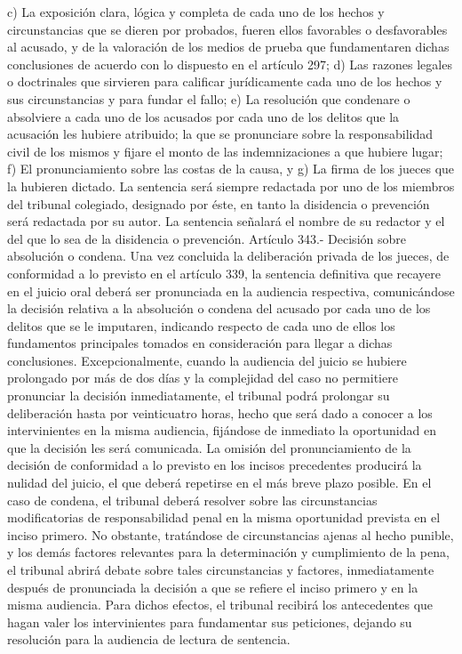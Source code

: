     c) La exposición clara, lógica y completa de cada uno de los hechos y circunstancias que se dieren por probados, fueren ellos favorables o desfavorables al acusado, y de la valoración de los medios de prueba que fundamentaren dichas conclusiones de acuerdo con lo dispuesto en el artículo 297;
    d) Las razones legales o doctrinales que sirvieren para calificar jurídicamente cada uno de los hechos y sus circunstancias y para fundar el fallo;
    e) La resolución que condenare o absolviere a cada uno de los acusados por cada uno de los delitos que la acusación les hubiere atribuido; la que se pronunciare sobre la responsabilidad civil de los mismos y fijare el monto de las indemnizaciones a que hubiere lugar;
    f) El pronunciamiento sobre las costas de la causa, y
    g) La firma de los jueces que la hubieren dictado.
    La sentencia será siempre redactada por uno de los miembros del tribunal colegiado, designado por éste, en tanto la disidencia o prevención será redactada por su autor. La sentencia señalará el nombre de su redactor y el del que lo sea de la disidencia o prevención.
    Artículo 343.- Decisión sobre absolución o condena. Una vez concluida la deliberación privada de los jueces, de conformidad a lo previsto en el artículo 339, la sentencia definitiva que recayere en el juicio oral deberá ser pronunciada en la audiencia respectiva, comunicándose la decisión relativa a la absolución o condena del acusado por cada uno de los delitos que se le imputaren, indicando respecto de cada uno de ellos los fundamentos principales tomados en consideración para llegar a dichas conclusiones.
    Excepcionalmente, cuando la audiencia del juicio se hubiere prolongado por más de dos días y la complejidad del caso no permitiere pronunciar la decisión inmediatamente, el tribunal podrá prolongar su deliberación hasta por veinticuatro horas, hecho que será dado a conocer a los intervinientes en la misma audiencia, fijándose de inmediato la oportunidad en que la decisión les será comunicada.
    La omisión del pronunciamiento de la decisión de conformidad a lo previsto en los incisos precedentes producirá la nulidad del juicio, el que deberá repetirse en el más breve plazo posible.
    En el caso de condena, el tribunal deberá resolver sobre las circunstancias modificatorias de responsabilidad penal en la misma oportunidad prevista en el inciso primero. No obstante, tratándose de circunstancias ajenas al hecho punible, y los demás factores relevantes para la determinación y cumplimiento de la pena, el tribunal abrirá debate sobre tales circunstancias y factores, inmediatamente después de pronunciada la decisión a que se refiere el inciso primero y en la misma audiencia. Para dichos efectos, el tribunal recibirá los antecedentes que hagan valer los intervinientes para fundamentar sus peticiones, dejando su resolución para la audiencia de lectura de sentencia.


